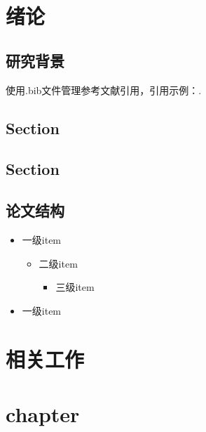 \documentclass[winfonts,bachelor,twoside]{njuthesis}
\begin{document}
\mainmatter

\chapter{绪论}\label{chapter_introduction}
\section{研究背景}
使用.bib文件管理参考文献引用，引用示例：\cite{BHR12}.\par
\lipsum[1]

\section{Section}\label{subsec:mptcp_conges}
\lipsum[1]

\section{Section}
\lipsum[1]




\section{论文结构}

\lipsum[1]
\begin{itemize}
\item 一级item
 \begin{itemize}
 \item 二级item
	\begin{itemize}
	\item 三级item

	\end{itemize}

 \end{itemize}
\item 一级item

\end{itemize}



\chapter{相关工作}

\lipsum[1]

\chapter{chapter}
\end{document}

